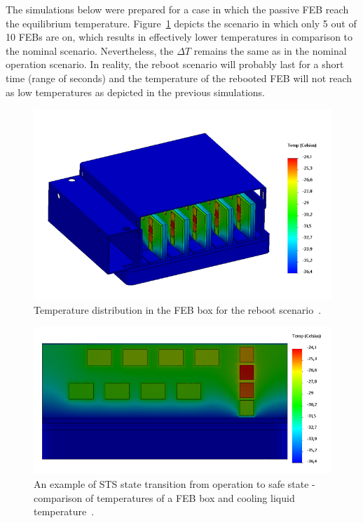 The simulations below were prepared for a case in which the passive \gls{FEB} reach the equilibrium temperature. Figure~\ref{fig_reboot_box} depicts the scenario in which only 5 out of 10 \glspl{FEB} are on, which results in effectively lower temperatures in comparison to the nominal scenario. Nevertheless, the $\Delta T$ remains the same as in the nominal operation scenario. In reality, the reboot scenario will probably last for a short time (range of seconds) and the temperature of the rebooted \gls{FEB} will not reach as low temperatures as depicted in the previous simulations.



\begin{figure}[!h]
\centering
\includegraphics[width=0.6\columnwidth]{Chapter4/images/reboot_box.png}
\caption{Temperature distribution in the \gls{FEB} box for the reboot scenario~\cite{thermal_cycling}.}
\label{fig_reboot_box}
\end{figure}

\begin{figure}[!h]
\centering
\includegraphics[width=0.6\columnwidth]{Chapter4/images/reboot_FEB.png}
\caption{An example of \gls{STS} state transition from operation to safe state - comparison of temperatures of a \gls{FEB} box and cooling liquid temperature~\cite{thermal_cycling}.}
\label{fig_reboot_FEB}
\end{figure}

